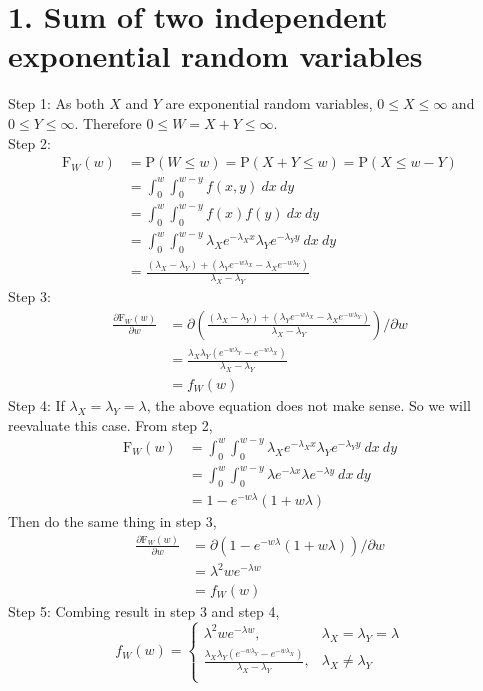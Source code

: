\documentclass{article}
\begin{document}
\section*{1. Sum of two independent exponential random variables}
Step 1: As both $X$ and $Y$ are exponential random variables, $0 \leq X \leq \infty$ and $0 \leq Y \leq \infty$. Therefore $0 \leq W = X+ Y \leq \infty$.\\
Step 2: 
\begin{align*}
\text{F}_W(w) &= \text{P}(W \leq w) = \text{P}(X+Y \leq w) = \text{P}(X \leq w-Y)\\
&= \int_{0}^{w}  \int_{0}^{w-y} f(x,y) \ dx \  dy \\
&= \int_{0}^{w}  \int_{0}^{w-y} f(x)  f(y) \ dx \  dy \\
&= \int_{0}^{w}  \int_{0}^{w-y} \lambda_Xe^{-\lambda_Xx}  \lambda_Ye^{-\lambda_Yy} \ dx \  dy \\
&= \frac{(\lambda_X-\lambda_Y)+(\lambda_Ye^{-w\lambda_X}-\lambda_Xe^{-w\lambda_Y})}{\lambda_X-\lambda_Y}
\end{align*}
Step 3:
\begin{align*}
\frac{\partial \text{F}_W(w)}{\partial w} &= \partial \left(\frac{(\lambda_X-\lambda_Y)+(\lambda_Ye^{-w\lambda_X}-\lambda_Xe^{-w\lambda_Y})}{\lambda_X-\lambda_Y}\right)/ \partial w \\
&= \frac{\lambda_X\lambda_Y(e^{-w\lambda_Y}-e^{-w\lambda_X})}{\lambda_X-\lambda_Y}\\
&= f_W(w)
\end{align*}
Step 4: If $\lambda_X=\lambda_Y = \lambda$, the above equation does not make sense. So we will reevaluate this case. From step 2,
\begin{align*}
\text{F}_W(w) &= \int_{0}^{w}  \int_{0}^{w-y} \lambda_Xe^{-\lambda_Xx}  \lambda_Ye^{-\lambda_Yy} \ dx \  dy \\
&=  \int_{0}^{w}  \int_{0}^{w-y} \lambda e^{-\lambda x}  \lambda e^{-\lambda y} \ dx \  dy \\
&= 1-e^{-w\lambda}(1+w\lambda)
\end{align*}
Then do the same thing in step 3,
\begin{align*}
\frac{\partial \text{F}_W(w)}{\partial w} &= \partial (1-e^{-w\lambda}(1+w\lambda))/{\partial w}\\
&= \lambda^2we^{-\lambda w}\\
&= f_W(w)
\end{align*}
Step 5: Combing result in step 3 and step 4,
\[
f_W(w) = 
\begin{cases}
\lambda^2we^{-\lambda w}, & \lambda_X = \lambda_Y=\lambda\\
\frac{\lambda_X\lambda_Y(e^{-w\lambda_Y}-e^{-w\lambda_X})}{\lambda_X-\lambda_Y}, & \lambda_X \neq \lambda_Y\\
\end{cases}
\]
\end{document}
